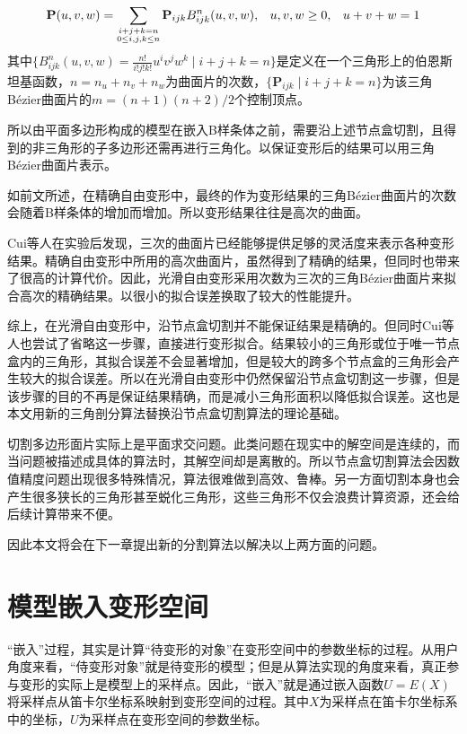 \begin{equation}
	\footnotesize
	{\mathbf P}(u,v,w)
	= \sum_{\substack{i+j+k=n \\ 0\leq i,j,k\leq n}} {\mathbf P}_{ijk}B^n_{ijk}(u,v,w), \hspace{8 pt} u,v,w\ge0,
		\hspace{8 pt}u+v+w=1
	\label{equ:Puvw}
\end{equation}
其中$\{B_{ijk}^n(u,v,w)=\frac{n!}{i!j!k!}u^iv^jw^k \mid i+j+k=n\}$是定义在一个三角形上的伯恩斯坦基函数，$n=n_u+n_v+n_w$为曲面片的次数，$\{\mathbf P_{ijk} \mid i+j+k=n\}$为该三角Bézier曲面片的$m=(n+1)(n+2)/2$个控制顶点。

所以由平面多边形构成的模型在嵌入B样条体之前，需要沿上述节点盒切割，且得到的非三角形的子多边形还需再进行三角化。以保证变形后的结果可以用三角Bézier曲面片表示。

如前文所述，在精确自由变形中，最终的作为变形结果的三角Bézier曲面片的次数会随着B样条体的增加而增加。所以变形结果往往是高次的曲面。

Cui等人在实验后发现，三次的曲面片已经能够提供足够的灵活度来表示各种变形结果\cite{Cui15}。精确自由变形中所用的高次曲面片，虽然得到了精确的结果，但同时也带来了很高的计算代价。因此，光滑自由变形采用次数为三次的三角Bézier曲面片来拟合高次的精确结果。以很小的拟合误差换取了较大的性能提升。

综上，在光滑自由变形中，沿节点盒切割并不能保证结果是精确的。但同时Cui等人也尝试了省略这一步骤，直接进行变形拟合。结果较小的三角形或位于唯一节点盒内的三角形，其拟合误差不会显著增加，但是较大的跨多个节点盒的三角形会产生较大的拟合误差。所以在光滑自由变形中仍然保留沿节点盒切割这一步骤，但是该步骤的目的不再是保证结果精确，而是减小三角形面积以降低拟合误差。这也是本文用新的三角剖分算法替换沿节点盒切割算法的理论基础。

切割多边形面片实际上是平面求交问题。此类问题在现实中的解空间是连续的，而当问题被描述成具体的算法时，其解空间却是离散的。所以节点盒切割算法会因数值精度问题出现很多特殊情况，算法很难做到高效、鲁棒。另一方面切割本身也会产生很多狭长的三角形甚至蜕化三角形，这些三角形不仅会浪费计算资源，还会给后续计算带来不便。

因此本文将会在下一章提出新的分割算法以解决以上两方面的问题。

\section{模型嵌入变形空间}
“嵌入”过程，其实是计算“待变形的对象”在变形空间中的参数坐标的过程。从用户角度来看，“侍变形对象”就是待变形的模型；但是从算法实现的角度来看，真正参与变形的实际上是模型上的采样点。因此，“嵌入”就是通过嵌入函数$U=E(X)$将采样点从笛卡尔坐标系映射到变形空间的过程。其中$X$为采样点在笛卡尔坐标系中的坐标，$U$为采样点在变形空间的参数坐标。

